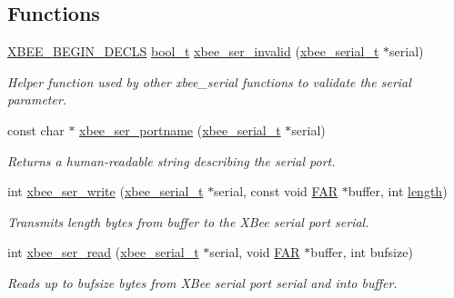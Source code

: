 \subsection*{Functions}
\begin{DoxyCompactItemize}
\item 
\hyperlink{group__hal_ga336bff4f4a6012aacc4468132bbd3d7f}{X\-B\-E\-E\-\_\-\-B\-E\-G\-I\-N\-\_\-\-D\-E\-C\-L\-S} \hyperlink{group__hal_ga04dd5074964518403bf944f2b240a5f8}{bool\-\_\-t} \hyperlink{group__xbee__serial_gae7f838b59f553507bf81a86042fe9cd7}{xbee\-\_\-ser\-\_\-invalid} (\hyperlink{structxbee__serial__t}{xbee\-\_\-serial\-\_\-t} $\ast$serial)
\begin{DoxyCompactList}\small\item\em Helper function used by other xbee\-\_\-serial functions to validate the {\itshape serial} parameter. \end{DoxyCompactList}\item 
const char $\ast$ \hyperlink{group__xbee__serial_ga898057d1b7645785e7f3d6256828d039}{xbee\-\_\-ser\-\_\-portname} (\hyperlink{structxbee__serial__t}{xbee\-\_\-serial\-\_\-t} $\ast$serial)
\begin{DoxyCompactList}\small\item\em Returns a human-\/readable string describing the serial port. \end{DoxyCompactList}\item 
int \hyperlink{group__xbee__serial_ga2ca4e60c9d642084afa52dff9e1f6be4}{xbee\-\_\-ser\-\_\-write} (\hyperlink{structxbee__serial__t}{xbee\-\_\-serial\-\_\-t} $\ast$serial, const void \hyperlink{group__hal_gaef060b3456fdcc093a7210a762d5f2ed}{F\-A\-R} $\ast$buffer, int \hyperlink{group__zdo_gab2b3adeb2a67e656ff030b56727fd0ac}{length})
\begin{DoxyCompactList}\small\item\em Transmits {\itshape length} bytes from {\itshape buffer} to the X\-Bee serial port {\itshape serial}. \end{DoxyCompactList}\item 
int \hyperlink{group__xbee__serial_ga8263312373c03a79a718142e051b3342}{xbee\-\_\-ser\-\_\-read} (\hyperlink{structxbee__serial__t}{xbee\-\_\-serial\-\_\-t} $\ast$serial, void \hyperlink{group__hal_gaef060b3456fdcc093a7210a762d5f2ed}{F\-A\-R} $\ast$buffer, int bufsize)
\begin{DoxyCompactList}\small\item\em Reads up to {\itshape bufsize} bytes from X\-Bee serial port {\itshape serial} and into {\itshape buffer}. \end{DoxyCompactList}\item 

\end{DoxyCompactItemize}
